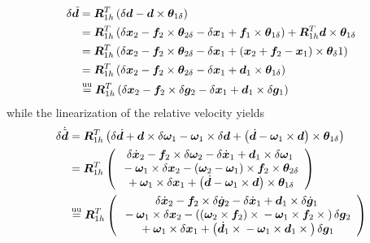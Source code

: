 \documentclass[10pt,fleqn,subeqn]{report}
\newcommand{\T}[1]{\bm{#1}}
\newcommand{\equu}{\overset{\text{uu}}{=}}
\begin{document}
\begin{align}
	\delta{\tilde{\T{d}}}
	&= \T{R}_{1h}^T\plbr{
		\delta\T{d} - \T{d} \times \T{\theta}_{1\delta}
	} \nonumber \\
	&= \T{R}_{1h}^T\plbr{
		\delta{\T{x}}_2 - \T{f}_2\times\T{\theta}_{2\delta}
		- \delta{\T{x}}_1 + \T{f}_1\times\T{\theta}_{1\delta}
	} + \T{R}_{1h}^T \T{d}\times\T{\theta}_{1\delta} \nonumber \\
	&= \T{R}_{1h}^T\plbr{
		\delta{\T{x}}_2
		- \T{f}_2\times\T{\theta}_{2\delta}
		- \delta{\T{x}}_1
		+ \plbr{
			\T{x}_2
			+ \T{f}_2
			- \T{x}_1
		}\times\T{\theta}_{\delta}1
	} \nonumber \\
	&= \T{R}_{1h}^T\plbr{
		\delta{\T{x}}_2
		- \T{f}_2\times\T{\theta}_{2\delta}
		- \delta{\T{x}}_1
		+ \T{d}_1\times\T{\theta}_{1\delta}
	} \nonumber \\
	&\equu \T{R}_{1h}^T\plbr{
		\delta{\T{x}}_2
		- \T{f}_2\times\delta\T{g}_2
		- \delta{\T{x}}_1
		+ \T{d}_1\times\delta\T{g}_1
	}
\end{align}
while the linearization of the relative velocity yields
\begin{align}
	\delta\dot{\tilde{\T{d}}}
	&= \T{R}_{1h}^T\plbr{
		\delta\dot{\T{d}}
		+ \T{d} \times \delta\T{\omega}_1
		- \T{\omega}_1 \times \delta\T{d}
		+ \plbr{
			\dot{\T{d}}
			- \T{\omega}_1 \times \T{d}
		}\times\T{\theta}_{1\delta}
	} \nonumber \\
	&= \T{R}_{1h}^T\plbr{\cvvect{
		\delta\dot{\T{x}}_2
		- \T{f}_2\times\delta\T{\omega}_2
		- \delta\dot{\T{x}}_1
		+ \T{d}_1\times\delta\T{\omega}_1 \\
	\mbox{} - \T{\omega}_1 \times \delta\T{x}_2
		- \plbr{
			\T{\omega}_2 
			- \T{\omega}_1
		} \times \T{f}_2 \times\T{\theta}_{2\delta} \\
	\mbox{} + \T{\omega}_1 \times \delta\T{x}_1
		+ \plbr{
			\dot{\T{d}} - \T{\omega}_1 \times \T{d}
		} \times \T{\theta}_{1\delta}
	}} \nonumber \\
	&\equu \T{R}_{1h}^T\plbr{\cvvect{
		\delta\dot{\T{x}}_2
		- \T{f}_2\times\delta\dot{\T{g}}_2
		- \delta\dot{\T{x}}_1
		+ \T{d}_1\times\delta\dot{\T{g}}_1 \\
	\mbox{} - \T{\omega}_1 \times \delta\T{x}_2
		- \plbr{
			\plbr{\T{\omega}_2 \times \T{f}_2}\times{}
			- \T{\omega}_1 \times \T{f}_2 \times{}
		} \delta\T{g}_2 \\
	\mbox{} + \T{\omega}_1 \times \delta\T{x}_1
		+ \plbr{
			\dot{\T{d}}_1 \times{}
			- \T{\omega}_1 \times \T{d}_1\times{}
		} \delta\T{g}_1
	}}
\end{align}
\end{document}
